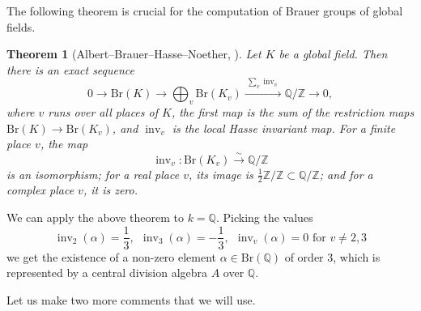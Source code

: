 \documentclass[10pt]{amsart}
\newtheorem{theorem}{Theorem}
\theoremstyle{definition}
\newcommand{\Br}{\mathrm{Br}}
\begin{document}

The following theorem is crucial for the computation of Brauer groups of global fields.

\begin{theorem}[Albert--Brauer--Hasse--Noether, {\cite[Thm.~8.1.17]{NSW2008}}]
Let $K$ be a global field. Then there is an exact sequence
\[
0 \longrightarrow \Br(K)
  \longrightarrow \bigoplus_{v} \Br(K_v)
  \xrightarrow{\ \sum_v \operatorname{inv}_v\ }
  \mathbb{Q}/\mathbb{Z}
  \longrightarrow 0,
\]
where $v$ runs over all places of $K$, the first map is the sum of the
restriction maps $\Br(K)\to \Br(K_v)$, and $\operatorname{inv}_v$ is the local
Hasse invariant map. For a finite place $v$, the map
\[
\operatorname{inv}_v \colon \Br(K_v)\xrightarrow{\sim} \mathbb{Q}/\mathbb{Z}
\]
is an isomorphism; for a real place $v$, its image is
$\frac{1}{2}\mathbb{Z}/\mathbb{Z}\subset \mathbb{Q}/\mathbb{Z}$; and for a
complex place $v$, it is zero.
\end{theorem}

We can apply the above theorem to $k = \mathbb{Q}$. Picking the values
\[ \operatorname{inv}_2(\alpha) = \frac{1}{3},~~  \operatorname{inv}_3(\alpha) = -\frac{1}{3}, ~~ \operatorname{inv}_v(\alpha) = 0 \text{ for } v \neq 2, 3 \]
we get the existence of a non-zero element $\alpha \in \Br(\mathbb{Q})$ of order $3$, which is represented by a central division algebra $A$ over $\mathbb{Q}$.

Let us make two more comments that we will use.
\end{document}
